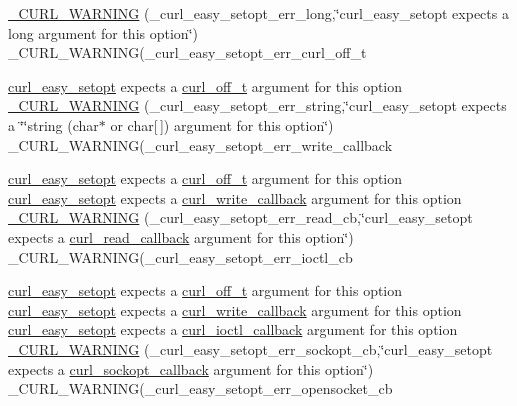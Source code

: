 \begin{DoxyCompactItemize}
\item 
\hyperlink{typecheck-gcc_8h_a835f9ac5fa04c88a7cd643014f43c521}{\+\_\+\+C\+U\+R\+L\+\_\+\+W\+A\+R\+N\+I\+NG} (\+\_\+curl\+\_\+easy\+\_\+setopt\+\_\+err\+\_\+long,\char`\"{}curl\+\_\+easy\+\_\+setopt expects a long argument for this option\char`\"{}) \+\_\+\+C\+U\+R\+L\+\_\+\+W\+A\+R\+N\+I\+NG(\+\_\+curl\+\_\+easy\+\_\+setopt\+\_\+err\+\_\+curl\+\_\+off\+\_\+t
\item 
\hyperlink{easy_8h_a7b171739b7bb728b3b58b2e6ec454aa0}{curl\+\_\+easy\+\_\+setopt} expects a \hyperlink{curlbuild_8h_a494e2b4279dc064f7ed1d0abd602b28d}{curl\+\_\+off\+\_\+t} argument for this option \hyperlink{typecheck-gcc_8h_a219fe3ed7d487a8ffe131d7330ca2483}{\+\_\+\+C\+U\+R\+L\+\_\+\+W\+A\+R\+N\+I\+NG} (\+\_\+curl\+\_\+easy\+\_\+setopt\+\_\+err\+\_\+string,\char`\"{}curl\+\_\+easy\+\_\+setopt expects a \char`\"{}\char`\"{}string (char$\ast$ or char\mbox{[}$\,$\mbox{]}) argument for this option\char`\"{}) \+\_\+\+C\+U\+R\+L\+\_\+\+W\+A\+R\+N\+I\+NG(\+\_\+curl\+\_\+easy\+\_\+setopt\+\_\+err\+\_\+write\+\_\+callback
\item 
\hyperlink{easy_8h_a7b171739b7bb728b3b58b2e6ec454aa0}{curl\+\_\+easy\+\_\+setopt} expects a \hyperlink{curlbuild_8h_a494e2b4279dc064f7ed1d0abd602b28d}{curl\+\_\+off\+\_\+t} argument for this option \hyperlink{easy_8h_a7b171739b7bb728b3b58b2e6ec454aa0}{curl\+\_\+easy\+\_\+setopt} expects a \hyperlink{curl_8h_ad65e62dcde45b356254b0f25f38dd802}{curl\+\_\+write\+\_\+callback} argument for this option \hyperlink{typecheck-gcc_8h_ab760cc0249f77f50bcb61700f5da7dd5}{\+\_\+\+C\+U\+R\+L\+\_\+\+W\+A\+R\+N\+I\+NG} (\+\_\+curl\+\_\+easy\+\_\+setopt\+\_\+err\+\_\+read\+\_\+cb,\char`\"{}curl\+\_\+easy\+\_\+setopt expects a \hyperlink{curl_8h_a7516630ec17f247697dd3272be7ada74}{curl\+\_\+read\+\_\+callback} argument for this option\char`\"{}) \+\_\+\+C\+U\+R\+L\+\_\+\+W\+A\+R\+N\+I\+NG(\+\_\+curl\+\_\+easy\+\_\+setopt\+\_\+err\+\_\+ioctl\+\_\+cb
\item 
\hyperlink{easy_8h_a7b171739b7bb728b3b58b2e6ec454aa0}{curl\+\_\+easy\+\_\+setopt} expects a \hyperlink{curlbuild_8h_a494e2b4279dc064f7ed1d0abd602b28d}{curl\+\_\+off\+\_\+t} argument for this option \hyperlink{easy_8h_a7b171739b7bb728b3b58b2e6ec454aa0}{curl\+\_\+easy\+\_\+setopt} expects a \hyperlink{curl_8h_ad65e62dcde45b356254b0f25f38dd802}{curl\+\_\+write\+\_\+callback} argument for this option \hyperlink{easy_8h_a7b171739b7bb728b3b58b2e6ec454aa0}{curl\+\_\+easy\+\_\+setopt} expects a \hyperlink{curl_8h_ae0524f6ec082005e39eb275c71c59a3b}{curl\+\_\+ioctl\+\_\+callback} argument for this option \hyperlink{typecheck-gcc_8h_a1f08648ae4665286d7eafbb6bbd1a818}{\+\_\+\+C\+U\+R\+L\+\_\+\+W\+A\+R\+N\+I\+NG} (\+\_\+curl\+\_\+easy\+\_\+setopt\+\_\+err\+\_\+sockopt\+\_\+cb,\char`\"{}curl\+\_\+easy\+\_\+setopt expects a \hyperlink{curl_8h_a687bc180c1842bae4d28f8803c307c70}{curl\+\_\+sockopt\+\_\+callback} argument for this option\char`\"{}) \+\_\+\+C\+U\+R\+L\+\_\+\+W\+A\+R\+N\+I\+NG(\+\_\+curl\+\_\+easy\+\_\+setopt\+\_\+err\+\_\+opensocket\+\_\+cb

\end{DoxyCompactItemize}
